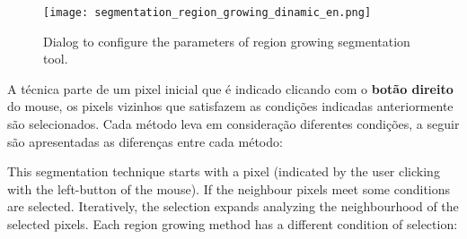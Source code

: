 \begin{figure}[!htb]
    \centering
    \texttt{[image: segmentation\_region\_growing\_dinamic\_en.png]}
    \caption{Dialog to configure the parameters of region growing segmentation tool.}
    \label{fig:segmentation_region_growing_dinamic}
\end{figure}

A técnica parte de um pixel inicial que é indicado clicando com o \textbf{botão direito} do mouse, os pixels vizinhos que satisfazem as condições indicadas anteriormente são selecionados. Cada método leva em consideração diferentes condições, a seguir são apresentadas as diferenças entre cada método:

This segmentation technique starts with a pixel (indicated by the user clicking with the left-button of the mouse). If the neighbour pixels meet some conditions are selected. Iteratively, the selection expands analyzing the neighbourhood of the selected pixels. Each region growing method has a different condition of selection:

